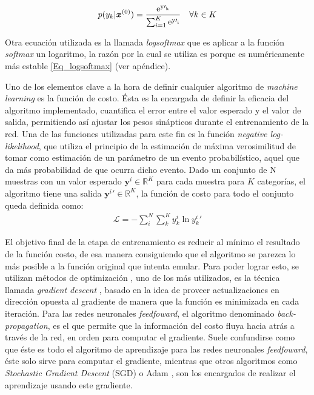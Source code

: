 \documentclass[spanish]{article}
\theoremstyle{definition}
\theoremstyle{remark}
\numberwithin{equation}{section}
\numberwithin{equation}{section} %
\begin{document}
\begin{equation}
\label{Eq_softmax}
p(y_k|\boldsymbol{x}^{(0)}) =  \frac{\rm{e}^{{y\prime}_k}}{\sum_{i=1}^{K}\rm{e}^{{y\prime}_i}} \quad \forall k \in K
\end{equation} \par
Otra ecuación utilizada es la llamada \textit{logsoftmax} que es aplicar a la función \textit{softmax} un logaritmo, la razón por la cual se utiliza es porque es numéricamente más estable \eqref{Eq_logsoftmax} (ver apéndice).\par
Uno de los elementos clave a la hora de definir cualquier algoritmo de \textit{machine learning} es la función de costo. Ésta es la encargada de definir la eficacia del algoritmo implementado, cuantifica el error entre el valor esperado y el valor de salida, permitiendo así ajustar los pesos sinápticos durante el entrenamiento de la red. Una de las funciones utilizadas para este fin es la función \textit{negative log-likelihood}, que utiliza el principio de la estimación de máxima verosimilitud de tomar como estimación de un parámetro de un evento probabilístico, aquel que da más probabilidad de que ocurra dicho evento. Dado un conjunto de N muestras con un valor esperado $\textbf{y}^{i} \in \mathbb{R}^{K}$ para cada muestra para $K$ categorías, el algoritmo tiene una salida $\textbf{y}^{i}\prime \in \mathbb{R}^{K}$, la función de costo para todo el conjunto queda definida como:   
\begin{equation}
\label{max_likelihood}
\begin{split}
\mathcal{L}= -\sum^{N}_{i}\sum^{K}_{k}y_k^i\ln{y_k^i\prime}
\end{split}
\end{equation} \par
\par
El objetivo final de la etapa de entrenamiento es reducir al mínimo el resultado de la función costo, de esa manera consiguiendo que el algoritmo se parezca lo más posible a la función original que intenta emular. Para poder lograr esto, se utilizan métodos de optimización%
, uno de los más utilizados, es la técnica llamada \textit{gradient descent} \cite{cauchy1847methode}, basado en la idea de proveer actualizaciones en dirección opuesta al gradiente de manera que la función es minimizada en cada iteración. %
Para las redes neuronales \textit{feedfoward}, el algoritmo denominado \textit{back-propagation}, es el que permite que la información del costo fluya hacia atrás a través de la red, en orden para computar el gradiente. Suele confundirse como que éste es todo el algoritmo de aprendizaje para las redes neuronales \textit{feedfoward}, éste solo sirve para computar el gradiente, mientras que otros algoritmos como \textit{Stochastic Gradient Descent} (SGD) \cite{robbins1951stochastic} o Adam \cite{kingma2014adam}, son los encargados de realizar el aprendizaje  usando este gradiente.  
\end{document}
